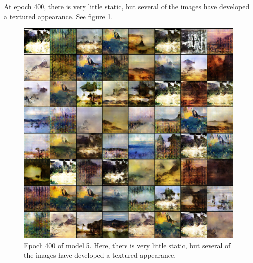 \documentclass[11pt,letterpaper]{article}
\begin{document}
				At epoch 400, there is very little static, but several of the images have developed a textured appearance.
				See figure \ref{fig:wa128:epoch400generator}.
				\begin{figure}
					\centering
					\includegraphics[width=1.0\linewidth]{results/model5/epoch400_generator}
					\caption{Epoch 400 of model 5. Here, there is very little static, but several of the images have developed a textured appearance.}
					\label{fig:wa128:epoch400generator}
				\end{figure}
\end{document}
